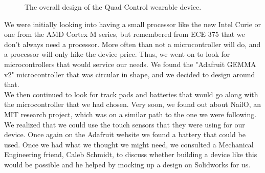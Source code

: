 \documentclass[12pt,letterpaper]{article}
\begin{document}
\begin{figure}
\begin{subfigure}{.5\textwidth}
		\label{fig:sub2}
	\end{subfigure}
	\caption{The overall design of the Quad Control wearable device.}
	\label{fig:test}
\end{figure}

\hspace{1cm}We were initially looking into having a small processor like the new Intel Curie or one from the AMD Cortex M series, but remembered from ECE 375 that we don't always need a processor. More often than not a microcontroller will do, and a processor will only hike the device price. Thus, we went on to look for microcontrollers that would service our needs. We found the "Adafruit GEMMA v2" microcontroller that was circular in shape, and we decided to design around that.\\
\hspace{1cm}We then continued to look for track pads and batteries that would go along with the microcontroller that we had chosen. Very soon, we found out about NailO, an MIT research project, which was on a similar path to the one we were following. We realized that we could use the touch sensors that they were using for our device. Once again on the Adafruit website we found a battery that could be used. Once we had what we thought we might need, we consulted a Mechanical Engineering friend, Caleb Schmidt, to discuss whether building a device like this would be possible and he helped by mocking up a design on Solidworks for us.\\
\end{document}
